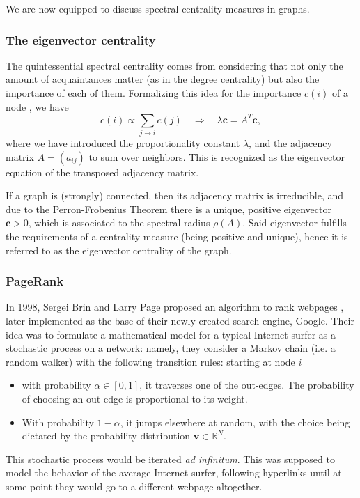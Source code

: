 \documentclass[sn-mathphys-ay]{sn-jnl}%
\newcommand{\R}{\mathbb{R}}
\newcommand{\bc}{\mathbf{c}}
\newcommand{\bv}{\bm{v}}
\theoremstyle{thmstyleone}%
\theoremstyle{thmstyletwo}%
\theoremstyle{thmstylethree}%
\begin{document}
We are now equipped to discuss spectral centrality measures in graphs.

\subsubsection{The eigenvector centrality} 

The quintessential spectral centrality comes from considering that not only the amount of acquaintances matter (as in the degree centrality) but also the importance of each of them. Formalizing this idea for the importance $c(i)$ of a node \cite{bonacich1972technique}, we have
\begin{equation}\label{eq:eigcent_derivation}
	c(i) \propto \sum_{j\rightarrow i} c(j) \quad \Rightarrow\quad  \lambda \bc = A^T \bc,
\end{equation}
where we have introduced the proportionality constant $\lambda$, and the adjacency matrix $A = (a_{ij})$ to sum over neighbors. This is recognized as the eigenvector equation of the transposed adjacency matrix.

If a graph is (strongly) connected, then its adjacency matrix is irreducible, and due to the Perron-Frobenius Theorem \cite{perron1907theorie} there is a unique, positive eigenvector $\bc>0$, which is associated to the spectral radius $\rho(A)$. Said eigenvector fulfills the requirements of a centrality measure (being positive and unique), hence it is referred to as the eigenvector centrality of the graph.


\subsubsection{PageRank} 

In 1998, Sergei Brin and Larry Page proposed an algorithm to rank webpages \cite{page1998pagerank}, later implemented as the base of their newly created search engine, Google. Their idea was to formulate a mathematical model for a typical Internet surfer as a stochastic process on a network: namely, they consider a Markov chain (i.e. a random walker) with the following transition rules: starting at node $i$ 
\begin{itemize}
	\item with probability $\alpha\in[0,1]$, it traverses one of the out-edges. The probability of choosing an out-edge is proportional to its weight.
	
	\item With probability $1-\alpha$, it jumps elsewhere at random, with the choice being dictated by the probability distribution $\bv\in\R^N$.
\end{itemize}
This stochastic process would be iterated \textit{ad infinitum}. This was supposed to model the behavior of the average Internet surfer, following hyperlinks until at some point they would go to a different webpage altogether. 
\end{document}
